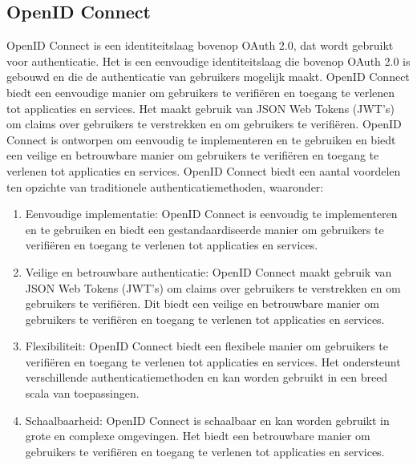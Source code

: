 \subsection{OpenID Connect}%
\label{subsec:openid-connect}
OpenID Connect is een identiteitslaag bovenop OAuth 2.0, dat wordt gebruikt voor authenticatie. Het is een eenvoudige identiteitslaag die bovenop OAuth 2.0 is gebouwd en die de authenticatie van gebruikers mogelijk maakt. OpenID Connect biedt een eenvoudige manier om gebruikers te verifiëren en toegang te verlenen tot applicaties en services. Het maakt gebruik van JSON Web Tokens (JWT's) om claims over gebruikers te verstrekken en om gebruikers te verifiëren. OpenID Connect is ontworpen om eenvoudig te implementeren en te gebruiken en biedt een veilige en betrouwbare manier om gebruikers te verifiëren en toegang te verlenen tot applicaties en services.
\newline
\newline
OpenID Connect biedt een aantal voordelen ten opzichte van traditionele authenticatiemethoden, waaronder:
\begin{enumerate}[label=\textbf{-}]
    \item Eenvoudige implementatie: OpenID Connect is eenvoudig te implementeren en te gebruiken en biedt een gestandaardiseerde manier om gebruikers te verifiëren en toegang te verlenen tot applicaties en services.
    \item Veilige en betrouwbare authenticatie: OpenID Connect maakt gebruik van JSON Web Tokens (JWT's) om claims over gebruikers te verstrekken en om gebruikers te verifiëren. Dit biedt een veilige en betrouwbare manier om gebruikers te verifiëren en toegang te verlenen tot applicaties en services.
    \item Flexibiliteit: OpenID Connect biedt een flexibele manier om gebruikers te verifiëren en toegang te verlenen tot applicaties en services. Het ondersteunt verschillende authenticatiemethoden en kan worden gebruikt in een breed scala van toepassingen.
    \item Schaalbaarheid: OpenID Connect is schaalbaar en kan worden gebruikt in grote en complexe omgevingen. Het biedt een betrouwbare manier om gebruikers te verifiëren en toegang te verlenen tot applicaties en services.
\end{enumerate}
\autocite{Sakimura2014}


